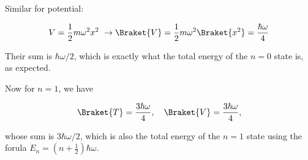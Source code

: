 \begin{parts}
Similar for potential:

\begin{equation*}
    V = \frac{1}{2}m\omega^2x^2 \ \rightarrow \Braket{V} = \frac{1}{2}m\omega^2 \Braket{x^2} = \frac{\hbar\omega}{4}
\end{equation*}

Their sum is $\hbar\omega/2$, which is exactly what the total energy of the $n=0$ state is, as expected. 

Now for $n=1$, we have

\begin{equation*}
    \Braket{T} = \frac{3\hbar\omega}{4}, \quad \Braket{V} = \frac{3\hbar\omega}{4},
\end{equation*}

whose sum is $3\hbar\omega/2$, which is also the total energy of the $n=1$ state using the forula $E_n = \left( n + \frac{1}{2} \right)\hbar\omega$.






\end{parts}